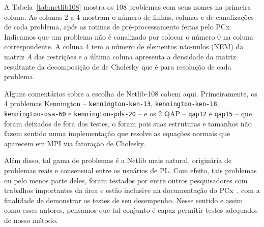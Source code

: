 A Tabela~\ref{tab:netlib108} mostra os \num{108} problemas com seus nomes na primeira coluna. As colunas 2 a 4 mostram o número de linhas, colunas e de canalizações de cada problema, após as rotinas de pré-processamento feitas pelo PCx. Indicamos que um problema  não é canalizado por colocar o número \num{0} na coluna correspondente. A coluna 4 tem o número de elementos não-nulos (NEM) da matriz $A$ das restrições e a última coluna apresenta a densidade da matriz resultante da decomposição de de Cholesky que é para resolução de cada problema.


Alguns comentários sobre a escolha de Netlib-108 cabem aqui. Primeiramente, os \num{4} problemas  Kennington -- \texttt{kennington-ken-13}, \texttt{kennington-ken-18}, \texttt{ken\-ning\-ton-osa-60} e \texttt{ken\-ning\-ton-pds-20} --  e os \num{2} QAP -- \texttt{qap12} e \texttt{qap15} --  que foram deixados de fora dos testes, o foram pois suas estruturas e tamanhos não fazem sentido numa implementação que resolve as equações normais que aparecem em \ac{MPI} via fatoração de Cholesky. 

Além disso, tal gama de problemas é a Netlib mais natural, originária de problemas reais e consensual entre os usuários de \ac{PL}. Com efeito, tais problemas ou pelo menos parte deles, foram testados por \textcite{Mehrotra:1992wr,Colombo:2008ia,Mehrotra:2005do,Jarre:1999tl,Gondzio:1996uw} entre outros pesquisadores com trabalhos importantes da área e estão inclusive na documentação do PCx~\cite{Czyzyk:1998vw,Czyzyk:1999hk}, com a finalidade de demonstrar os testes de seu desempenho. Nesse sentido e assim como esses autores, pensamos que tal conjunto é capaz permitir testes adequados de nosso método. 


